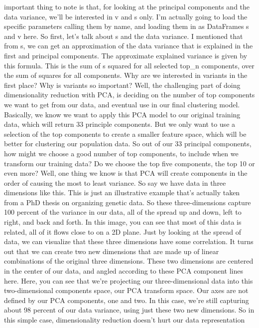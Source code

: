important thing to note is that, for looking at the principal components
and the data variance, we'll be interested in v and s only. I'm actually
going to load the specific parameters calling them by name, and loading
them in as DataFrames s and v here. So first, let's talk about s and the
data variance. I mentioned that from s, we can get an approximation of
the data variance that is explained in the first and principal
components. The approximate explained variance is given by this formula.
This is the sum of s squared for all selected top\_n components, over
the sum of squares for all components. Why are we interested in variants
in the first place? Why is variants so important? Well, the challenging
part of doing dimensionality reduction with PCA, is deciding on the
number of top components we want to get from our data, and eventual use
in our final clustering model. Basically, we know we want to apply this
PCA model to our original training data, which will return 33 principle
components. But we only want to use a selection of the top components to
create a smaller feature space, which will be better for clustering our
population data. So out of our 33 principal components, how might we
choose a good number of top components, to include when we transform our
training data? Do we choose the top five components, the top 10 or even
more? Well, one thing we know is that PCA will create components in the
order of causing the most to least variance. So say we have data in
three dimensions like this. This is just an illustrative example that's
actually taken from a PhD thesis on organizing genetic data. So these
three-dimensions capture 100 percent of the variance in our data, all of
the spread up and down, left to right, and back and forth. In this
image, you can see that most of this data is related, all of it flows
close to on a 2D plane. Just by looking at the spread of data, we can
visualize that these three dimensions have some correlation. It turns
out that we can create two new dimensions that are made up of linear
combinations of the original three dimensions. These two dimensions are
centered in the center of our data, and angled according to these PCA
component lines here. Here, you can see that we're projecting our
three-dimensional data into this two-dimensional components space, our
PCA transform space. Our axes are not defined by our PCA components, one
and two. In this case, we're still capturing about 98 percent of our
data variance, using just these two new dimensions. So in this simple
case, dimensionality reduction doesn't hurt our data representation

